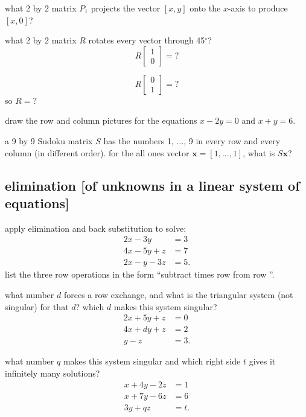 \documentclass[addpoints]{exam}
\begin{document}
\begin{questions}
\question what 2 by 2 matrix $P_1$ projects the vector $[x, y]$ onto the $x$-axis to produce $[x,0]$?

\question what 2 by 2 matrix $R$ rotates every vector through 45$^\circ$? 
\begin{equation*}
	R
	\begin{bmatrix}
	 1 \\
	 0
	\end{bmatrix}
	=
	?
\end{equation*}

\begin{equation*}
	R
	\begin{bmatrix}
	 0 \\
	 1
	\end{bmatrix}
	=
	?
\end{equation*}
so $R=?$

\question draw the row and column pictures for the equations $x-2y=0$ and $x+y=6$.

\question a 9 by 9 Sudoku matrix $S$ has the numbers 1, ..., 9 in every row and every column (in different order). for the all ones vector $\mathbf{x}=[1, ..., 1]$, what is $S\mathbf{x}$?

\subsection*{elimination [of unknowns in a linear system of equations]}
\question apply elimination and back substitution to solve:
\begin{align*}
	2x-3y &=3 \\
	4x-5y+z&=7 \\
	2x-y-3z&=5.
\end{align*}
list the three row operations in the form ``subtract \fillin times row \fillin from row \fillin''.

\question what number $d$ forces a row exchange, and what is the triangular system (not singular) for that $d$? which $d$ makes this system singular?
\begin{align*}
	2x+5y+z &=0 \\
	4x+dy+z&=2 \\
	y-z&=3.
\end{align*}

\question what number $q$ makes this system singular and which right side $t$ gives it infinitely many solutions?
\begin{align*}
	x+4y-2z &=1 \\
	x+7y-6z&=6 \\
	3y+qz&=t.
\end{align*}


\end{questions}
\end{document}
